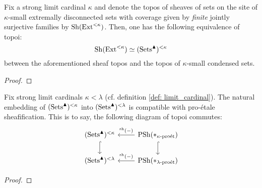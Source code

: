             \begin{lemma} \label{lemma: small_condensed_sets_and_extremally_disconnected_sets}
                Fix a strong limit cardinal $\kappa$ and denote the topos of sheaves of sets on the site of $\kappa$-small extremally disconnected sets with coverage given by \textit{finite} jointly surjective families by $\mathrm{Sh}(\mathrm{Ext}^{< \kappa})$. Then, one has the following equivalence of topoi:
                    $$\mathrm{Sh}(\mathrm{Ext}^{< \kappa}) \simeq (\mathrm{Sets}^{\blacktriangle})^{< \kappa}$$
                between the aforementioned sheaf topos and the topos of $\kappa$-small condensed sets.
            \end{lemma}
                \begin{proof}
                    
                \end{proof}
                
            \begin{lemma} \label{lemma: large_condensed_sets}
                Fix strong limit cardinals $\kappa < \lambda$ (cf. definition \ref{def: limit_cardinal}). The natural embedding of $(\mathrm{Sets}^{\blacktriangle})^{< \kappa}$ into $(\mathrm{Sets}^{\blacktriangle})^{< \lambda}$ is compatible with pro-\'etale sheafification. This is to say, the following diagram of topoi commutes:
                    $$
                        \begin{tikzcd}
                        	{(\Sets^{\cond})^{< \kappa}} & {\Psh(*_{\kappa\-\proet})} \\
                        	{(\Sets^{\cond})^{< \lambda}} & {\Psh(*_{\lambda\-\proet})}
                        	\arrow[hook, from=1-1, to=2-1]
                        	\arrow[hook, from=1-2, to=2-2]
                        	\arrow["{{}^{\sh}(-)}"', from=1-2, to=1-1]
                        	\arrow["{{}^{\sh}(-)}"', from=2-2, to=2-1]
                        \end{tikzcd}
                    $$
            \end{lemma}
                \begin{proof}
                    
                \end{proof}
            

